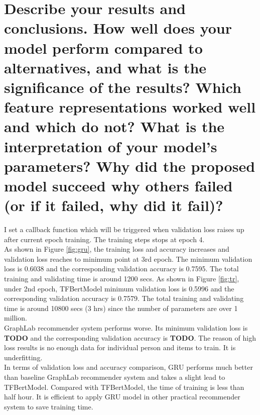 \documentclass[12pt]{article}
\begin{document}
\section{Describe your results and conclusions. How well does your model perform compared to
alternatives, and what is the significance of the results? Which feature representations worked
well and which do not? What is the interpretation of your model’s parameters? Why did the
proposed model succeed why others failed (or if it failed, why did it fail)?}
I set a callback function which will be triggered when validation loss raises up after current epoch training.
The training steps stops at epoch 4.\\
As shown in Figure \ref{fig:gru}, the training loss and accuracy increases and validation loss reaches to minimum
point at 3rd epoch. The minimum validation loss is 0.6038 and the corresponding validation accuracy is 0.7595.
The total training and validating time is around 1200 secs.
As shown in Figure \ref{fig:tr}, under 2nd epoch, TFBertModel minimum validation loss is 0.5996 and the
corresponding validation accuracy is 0.7579. The total training and validating time is around 10800 secs (3 hrs)
since the number of parameters are over 1 million.\\
GraphLab recommender system performs worse. Its minimum validation loss is \textbf{TODO} and the corresponding
validation accuracy is \textbf{TODO}. The reason of high loss results is no enough data for individual person
and items to train. It is underfitting.\\
In terms of validation loss and accuracy comparison, GRU performs much better than baseline GraphLab recommender
system
and takes a slight lead to TFBertModel.
Compared with TFBertModel, the time of training is less than half hour. It is efficient to apply GRU model in
other practical recommender system to save training time.
\end{document}
